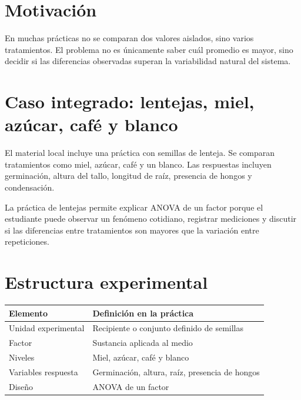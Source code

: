 
\section{Motivación}

En muchas prácticas no se comparan dos valores aislados, sino varios tratamientos. El problema no es únicamente saber cuál promedio es mayor, sino decidir si las diferencias observadas superan la variabilidad natural del sistema.

\section{Caso integrado: lentejas, miel, azúcar, café y blanco}

El material local incluye una práctica con semillas de lenteja. Se comparan tratamientos como miel, azúcar, café y un blanco. Las respuestas incluyen germinación, altura del tallo, longitud de raíz, presencia de hongos y condensación.

\begin{practica}
La práctica de lentejas permite explicar ANOVA de un factor porque el estudiante puede observar un fenómeno cotidiano, registrar mediciones y discutir si las diferencias entre tratamientos son mayores que la variación entre repeticiones.
\end{practica}

\section{Estructura experimental}

\begin{table}[H]
\centering
\begin{tabular}{p{}p{}}
\toprule
Elemento & Definición en la práctica\\
\midrule
Unidad experimental & Recipiente o conjunto definido de semillas\\
Factor & Sustancia aplicada al medio\\
Niveles & Miel, azúcar, café y blanco\\
Variables respuesta & Germinación, altura, raíz, presencia de hongos\\
Diseño & ANOVA de un factor\\
\bottomrule
\end{tabular}
\end{table}

